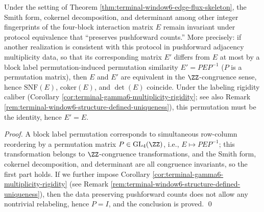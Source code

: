 \begin{corollary}\label{cor:window6-edge-flux-arithmetic-protocol-invariant}
Under the setting of Theorem \ref{thm:terminal-window6-edge-flux-skeleton},
the Smith form, cokernel decomposition, and determinant among other integer fingerprints of the four-block interaction matrix \(E\) remain invariant under protocol equivalence that ``preserves pushforward counts.''
More precisely: if another realization is consistent with this protocol in pushforward adjacency multiplicity data, so that its corresponding matrix \(E'\) differs from \(E\) at most by a block label permutation-induced permutation similarity \(E'=PEP^{-1}\) (\(P\) is a permutation matrix),
then \(E\) and \(E'\) are equivalent in the \(\ZZ\)-congruence sense, hence \(\mathrm{SNF}(E)\), \(\mathrm{coker}(E)\), and \(\det(E)\) coincide.
Under the labeling rigidity caliber (Corollary \ref{cor:terminal-gamma6-multiplicity-rigidity}; see also Remark \ref{rem:terminal-window6-structure-defined-uniqueness}), this permutation must be the identity, hence \(E'=E\).
\end{corollary}
\begin{proof}
A block label permutation corresponds to simultaneous row-column reordering by a permutation matrix \(P\in\mathrm{GL}_4(\ZZ)\), i.e., \(E\mapsto PEP^{-1}\);
this transformation belongs to \(\ZZ\)-congruence transformations, and the Smith form, cokernel decomposition, and determinant are all congruence invariants, so the first part holds.
If we further impose Corollary \ref{cor:terminal-gamma6-multiplicity-rigidity} (see Remark \ref{rem:terminal-window6-structure-defined-uniqueness}), then the data preserving pushforward counts does not allow any nontrivial relabeling, hence \(P=I\), and the conclusion is proved. \qed
\end{proof}

